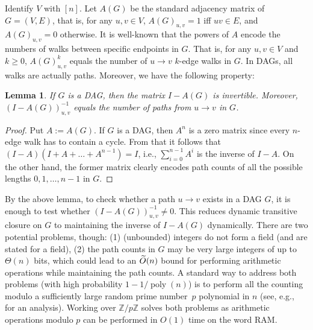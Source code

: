 \documentclass[11pt]{article}
\newtheorem{lemma}[theorem]{Lemma}
\newcommand{\poly}[1]{\ensuremath{\operatorname{poly}\left( #1 \right)}\xspace}
\begin{document}
{Identify $V$ with $[n]$. Let $A(G)$ be the standard adjacency matrix of $G=(V,E)$, that is,
for any $u,v\in V$, $A(G)_{u,v}=1$ iff $uv\in E$, and $A(G)_{u,v}=0$ otherwise.
It is well-known that the powers of $A$ encode
the numbers of walks between specific endpoints in $G$. That is, for any $u,v\in V$
and $k\geq 0$, $A(G)_{u,v}^k$ equals the number of $u\to v$ $k$-edge walks in $G$.
In DAGs, all walks are actually paths. Moreover, we have the following property:
\begin{lemma}\label{lem:dag-path-count}
    If $G$ is a DAG, then the matrix $I-A(G)$ is invertible. Moreover, $(I-A(G))^{-1}_{u,v}$
    equals the number of paths from $u\to v$ in $G$.
\end{lemma}
\begin{proof}
Put $A:=A(G)$. If $G$ is a DAG, then $A^n$ is a zero matrix since every $n$-edge walk has to contain a cycle. From that it follows that $(I-A)(I+A+\ldots+A^{n-1})=I$, i.e., $\sum_{i=0}^{n-1}A^i$
is the inverse of $I-A$. On the other hand, the former matrix clearly encodes path counts of all the possible lengths $0,1,\ldots,n-1$ in $G$.
\end{proof}
By the above lemma, to check whether a path $u\to v$ exists in a DAG $G$, it is enough to test whether $(I-A(G))^{-1}_{u,v}\neq 0$.
This reduces dynamic transitive closure on $G$ to maintaining the inverse of $I-A(G)$ dynamically.
There are two potential problems, though: (1) (unbounded) integers do not form a field (and  are stated for a field), (2) the path counts in $G$ may be very large integers of up to $\Theta(n)$
bits, which could lead to an $\widetilde{O}(n)$ bound for performing arithmetic operations while maintaining the path counts. A standard way to address both problems (with high probability $1-1/\poly{n}$) is to perform all the counting modulo a sufficiently large random prime number~$p$ polynomial in $n$ (see, e.g.,~\cite[Section~3.4]{DBLP:journals/jcss/KingS02} for an analysis). Working over $\mathbb{Z}/p\mathbb{Z}$ solves both problems as arithmetic operations modulo $p$ can be performed in $O(1)$ time on the word RAM.

}
\end{document}
